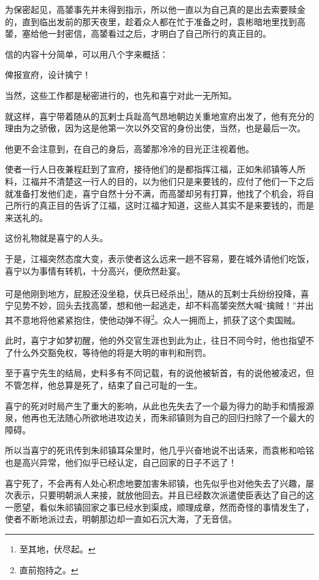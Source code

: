 \begin{multicols}{\theparacolNo}
为保密起见，高𨭉事先并未得到指示，所以他一直以为自己真的是出去索要赎金的，直到临出发前的那天夜里，趁着众人都在忙于准备之时，袁彬暗地里找到高𨭉，塞给他一封密信，高𨭉看过之后，才明白了自己所行的真正目的。

信的内容十分简单，可以用八个字来概括：

俾报宣府，设计擒宁！

当然，这些工作都是秘密进行的，也先和喜宁对此一无所知。

就这样，喜宁带着随从的瓦剌士兵趾高气昂地朝边关重地宣府出发了，他有充分的理由为之骄傲，因为这是他第一次以外交官的身份出使，当然，也是最后一次。

他更不会注意到，在自己的身后，高𨭉那冷冷的目光正注视着他。

使者一行人日夜兼程赶到了宣府，接待他们的是都指挥江福，正如朱祁镇等人所料，江福并不清楚这一行人的目的，以为他们只是来要钱的，应付了他们一下之后就准备打发他们走，喜宁自然十分不满，而高𨭉却另有打算，他找了个机会，将自己所行的真正目的告诉了江福，这时江福才知道，这些人其实不是来要钱的，而是来送礼的。

这份礼物就是喜宁的人头。

于是，江福突然态度大变，表示使者这么远来一趟不容易，要在城外请他们吃饭，喜宁以为事情有转机，十分高兴，便欣然赴宴。

可是他刚到地方，屁股还没坐稳，伏兵已经杀出\footnote{至其地，伏尽起。}，随从的瓦剌士兵纷纷投降，喜宁见势不妙，回头去找高𨭉，想和他一起逃走，却不料高𨭉突然大喊“擒贼！”并出其不意地将他紧紧抱住，使他动弹不得\footnote{直前抱持之。}。众人一拥而上，抓获了这个卖国贼。

此时，喜宁才如梦初醒，他的外交官生涯也到此为止，往日不同今时，他也指望不了什么外交豁免权，等待他的将是大明的审判和刑罚。

至于喜宁先生的结局，史料多有不同记载，有的说他被斩首，有的说他被凌迟，但不管怎样，他总算是死了，结束了自己可耻的一生。

喜宁的死对时局产生了重大的影响，从此也先失去了一个最为得力的助手和情报源泉，他再也无法随心所欲地进攻边关，而朱祁镇则为自己的回归扫除了一个最大的障碍。

所以当喜宁的死讯传到朱祁镇耳朵里时，他几乎兴奋地说不出话来，而袁彬和哈铭也是高兴异常，他们似乎已经认定，自己回家的日子不远了！

喜宁死了，不会再有人处心积虑地要加害朱祁镇，也先似乎也对他失去了兴趣，屡次表示，只要明朝派人来接，就放他回去。并且已经数次派遣使臣表达了自己的这一愿望，看似朱祁镇回家之事已经水到渠成，顺理成章，然而奇怪的事情发生了，使者不断地派过去，明朝那边却一直如石沉大海，了无音信。


\end{multicols}
